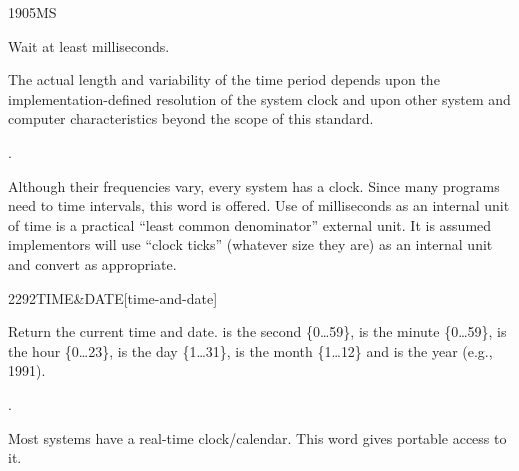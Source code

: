 

\begin{worddef}{1905}{MS}
\item {}

	Wait at least  milliseconds.

\note
	The actual length and variability of the time period depends
	upon the {im\-ple\-ment\-ation-de\-fin\-ed} resolution of the system clock
	and upon other system and computer characteristics beyond the
	scope of this standard.

\see {}.

	\begin{rationale} %
		Although their frequencies vary, every system has a clock.
		Since many programs need to time intervals, this word is
		offered. Use of milliseconds as an internal unit of time is
		a practical ``least common denominator'' external unit. It
		is assumed implementors will use ``clock ticks'' (whatever
		size they are) as an internal unit and convert as appropriate.
	\end{rationale}
\end{worddef}

\enlargethispage{4ex}
\begin{worddef}[TIMEandDATE]{2292}{TIME\&DATE}[time-and-date]
\item {}

	Return the current time and date.
	 is the second \{0{\ldots}59\},
	 is the minute \{0{\ldots}59\},
	 is the hour \{0{\ldots}23\},
	 is the day \{1{\ldots}31\},
	 is the month \{1{\ldots}12\} and
	 is the year (e.g., 1991).

\see {}.

	\begin{rationale} %
		Most systems have a real-time clock/calendar.
		This word gives portable access to it.
	\end{rationale}
\end{worddef}

